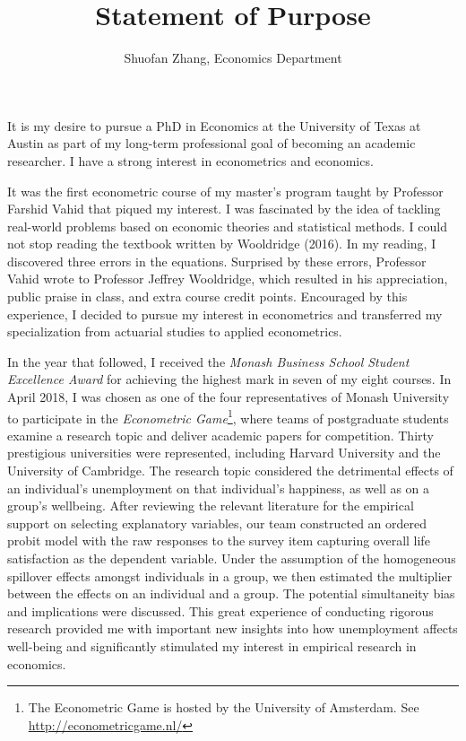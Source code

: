 \documentclass[12pt,]{article}
\title{Statement of Purpose}
\author{Shuofan Zhang, Economics Department}
\date{}
\let\rmarkdownfootnote\footnote%
\def\footnote{\protect\rmarkdownfootnote}
\begin{document}
\maketitle


It is my desire to pursue a PhD in Economics at the University of Texas
at Austin as part of my long-term professional goal of becoming an
academic researcher. I have a strong interest in econometrics and
economics.

It was the first econometric course of my master's program taught by
Professor Farshid Vahid that piqued my interest. I was fascinated by the
idea of tackling real-world problems based on economic theories and
statistical methods. I could not stop reading the textbook written by
Wooldridge (2016). In my reading, I discovered three errors in the
equations. Surprised by these errors, Professor Vahid wrote to Professor
Jeffrey Wooldridge, which resulted in his appreciation, public praise in
class, and extra course credit points. Encouraged by this experience, I
decided to pursue my interest in econometrics and transferred my
specialization from actuarial studies to applied econometrics.

In the year that followed, I received the \emph{Monash Business School
Student Excellence Award} for achieving the highest mark in seven of my
eight courses. In April 2018, I was chosen as one of the four
representatives of Monash University to participate in the
\emph{Econometric Game}\footnote{The Econometric Game is hosted by the
  University of Amsterdam. See \url{http://econometricgame.nl/}}, where
teams of postgraduate students examine a research topic and deliver
academic papers for competition. Thirty prestigious universities were
represented, including Harvard University and the University of
Cambridge. The research topic considered the detrimental effects of an
individual's unemployment on that individual's happiness, as well as on
a group's wellbeing. After reviewing the relevant literature for the
empirical support on selecting explanatory variables, our team
constructed an ordered probit model with the raw responses to the survey
item capturing overall life satisfaction as the dependent variable.
Under the assumption of the homogeneous spillover effects amongst
individuals in a group, we then estimated the multiplier between the
effects on an individual and a group. The potential simultaneity bias
and implications were discussed. This great experience of conducting
rigorous research provided me with important new insights into how
unemployment affects well-being and significantly stimulated my interest
in empirical research in economics.
\end{document}
